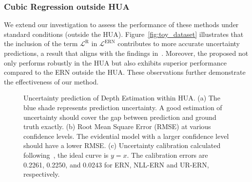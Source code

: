 \subsubsection{Cubic Regression outside HUA}
We extend our investigation to assess the performance of these methods under standard conditions (outside the HUA). Figure~\ref{fig:toy_dataset} illustrates that the inclusion of the term $\mathcal{L}^{\mathrm{R}}$ in $\mathcal{L}^{\mathrm{ERN}}$ contributes to more accurate uncertainty predictions, a result that aligns with the findings in~\citeauthor{NEURIPS2020_aab08546}. Moreover, the proposed \ours not only performs robustly in the HUA but also exhibits superior performance compared to the ERN outside the HUA. These observations further demonstrate the effectiveness of our method.



\begin{figure}[t!]
  \centering
  \caption{Uncertainty prediction of Depth Estimation within HUA. (a) The blue shade represents prediction uncertainty. A good estimation of uncertainty should cover the gap between prediction and ground truth exactly. (b) Root Mean Square Error (RMSE) at various confidence levels. The evidential model with a larger confidence level should have a lower RMSE. (c) Uncertainty calibration calculated following~\citeauthor{kuleshov2018accurate}, the ideal curve is $y=x$. The calibration errors are 0.2261, 0.2250, and 0.0243 for ERN, NLL-ERN and UR-ERN, respectively.}
  \label{fig:depth_HUA}
\end{figure}

